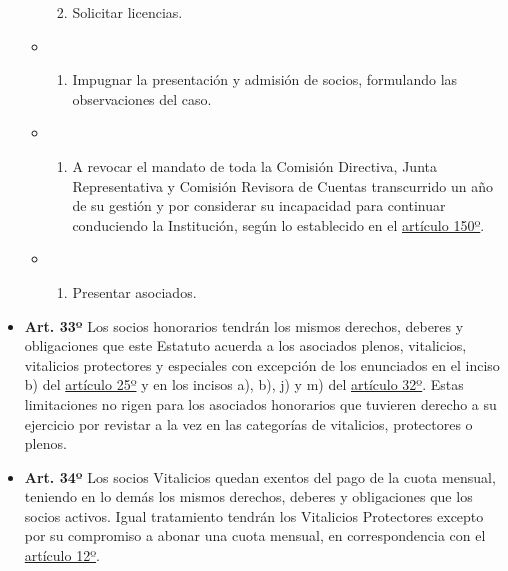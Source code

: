 \documentclass[openany]{book}
\providecommand{\tightlist}{%
  \setlength{\itemsep}{0pt}\setlength{\parskip}{0pt}}
\begin{document}
\begin{itemize}
\begin{itemize}
    \begin{enumerate}
    \def\labelenumi{\alph{enumi})}
    \setcounter{enumi}{10}
    \tightlist
    \item
      Solicitar licencias.
    \end{enumerate}
  \item
    \begin{enumerate}
    \def\labelenumi{\alph{enumi})}
    \setcounter{enumi}{11}
    \tightlist
    \item
      Impugnar la presentación y admisión de socios, formulando las observaciones del caso.
    \end{enumerate}
  \item
    \begin{enumerate}
    \def\labelenumi{\alph{enumi})}
    \setcounter{enumi}{12}
    \tightlist
    \item
      A revocar el mandato de toda la Comisión Directiva, Junta Representativa y Comisión Revisora de Cuentas transcurrido un año de su gestión y por considerar su incapacidad para continuar conduciendo la Institución, según lo establecido en el \protect\hyperlink{art150}{artículo 150º}.
    \end{enumerate}
  \item
    \begin{enumerate}
    \def\labelenumi{\alph{enumi})}
    \setcounter{enumi}{13}
    \tightlist
    \item
      Presentar asociados.
    \end{enumerate}
  \end{itemize}
\end{itemize}

\begin{itemize}
\tightlist
\item
  \textbf{Art. 33º}
  Los socios honorarios tendrán los mismos derechos, deberes y obligaciones que este Estatuto acuerda a los asociados plenos, vitalicios, vitalicios protectores y especiales con excepción de los enunciados en el inciso b) del \protect\hyperlink{art25}{artículo 25º} y en los incisos a), b), j) y m) del \protect\hyperlink{art32}{artículo 32º}. Estas limitaciones no rigen para los asociados honorarios que tuvieren derecho a su ejercicio por revistar a la vez en las categorías de vitalicios, protectores o plenos.
\end{itemize}

\begin{itemize}
\tightlist
\item
  \textbf{Art. 34º}
  Los socios Vitalicios quedan exentos del pago de la cuota mensual, teniendo en lo demás los mismos derechos, deberes y obligaciones que los socios activos. Igual tratamiento tendrán los Vitalicios Protectores excepto por su compromiso a abonar una cuota mensual, en correspondencia con el \protect\hyperlink{art12}{artículo 12º}.
\end{itemize}
\end{document}
